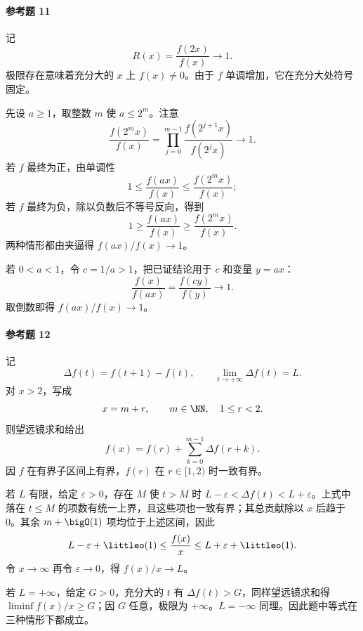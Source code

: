 \paragraph{参考题 11}
\begin{xsolution}
记
\[
  R(x)=\frac{f(2x)}{f(x)}\to1.
\]
极限存在意味着充分大的 $x$ 上 $f(x)\ne0$。由于 $f$ 单调增加，它在充分大处符号固定。

先设 $a\geq1$，取整数 $m$ 使 $a\leq2^m$。注意
\[
  \frac{f(2^m x)}{f(x)}
  =\prod_{j=0}^{m-1}\frac{f(2^{j+1}x)}{f(2^j x)}\to1.
\]
若 $f$ 最终为正，由单调性
\[
  1\leq\frac{f(ax)}{f(x)}\leq\frac{f(2^m x)}{f(x)};
\]
若 $f$ 最终为负，除以负数后不等号反向，得到
\[
  1\geq\frac{f(ax)}{f(x)}\geq\frac{f(2^m x)}{f(x)}.
\]
两种情形都由夹逼得 $f(ax)/f(x)\to1$。

若 $0<a<1$，令 $c=1/a>1$，把已证结论用于 $c$ 和变量 $y=ax$：
\[
  \frac{f(x)}{f(ax)}=\frac{f(cy)}{f(y)}\to1.
\]
取倒数即得 $f(ax)/f(x)\to1$。
\end{xsolution}

\paragraph{参考题 12}
\begin{xsolution}
记
\[
  \Delta f(t)=f(t+1)-f(t),
  \qquad \lim_{t\to+\infty}\Delta f(t)=L.
\]
对 $x>2$，写成
\[
  x=m+r,\qquad m\in\NN,\quad 1\leq r<2.
\]
则望远镜求和给出
\[
  f(x)=f(r)+\sum_{k=0}^{m-1}\Delta f(r+k).
\]
因 $f$ 在有界子区间上有界，$f(r)$ 在 $r\in[1,2)$ 时一致有界。

若 $L$ 有限，给定 $\varepsilon>0$，存在 $M$ 使 $t>M$ 时
$L-\varepsilon<\Delta f(t)<L+\varepsilon$。上式中落在 $t\leq M$ 的项数有统一上界，且这些项也一致有界；其总贡献除以 $x$ 后趋于 0。其余 $m+\bigO(1)$ 项均位于上述区间，因此
\[
  L-\varepsilon+\littleo(1)
  \leq\frac{f(x)}x
  \leq L+\varepsilon+\littleo(1).
\]
令 $x\to\infty$ 再令 $\varepsilon\to0$，得 $f(x)/x\to L$。

若 $L=+\infty$，给定 $G>0$，充分大的 $t$ 有 $\Delta f(t)>G$，同样望远镜求和得
$\liminf f(x)/x\geq G$；因 $G$ 任意，极限为 $+\infty$。$L=-\infty$ 同理。因此题中等式在三种情形下都成立。
\end{xsolution}

